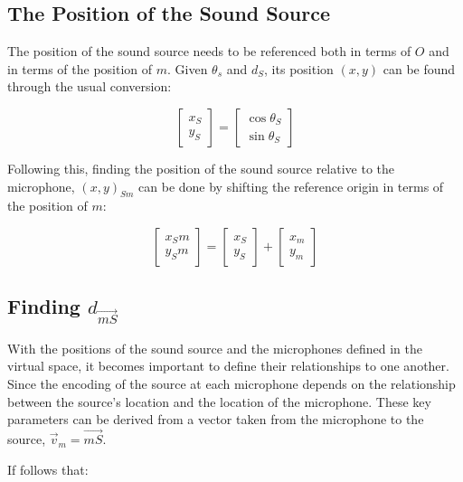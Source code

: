 \subsection{The Position of the Sound Source}

The position of the sound source needs to be referenced both in terms of $O$ and in terms of the position of $m$. Given $\theta_s$ and $d_S$, its position $(x,y)$ can be found through the usual conversion:

\begin{equation}
\begin{bmatrix} x_S \\ y_S \end{bmatrix} = \begin{bmatrix} \cos{\theta_S} \\ \sin{\theta_S} \end{bmatrix}
\end{equation}

Following this, finding the position of the sound source relative to the microphone, $(x,y)_{Sm}$ can be done by shifting the reference origin in terms of the position of $m$:

\begin{equation}
\begin{bmatrix} x_Sm \\ y_Sm \end{bmatrix} = \begin{bmatrix} x_S \\ y_S \end{bmatrix} + \begin{bmatrix} x_m \\ y_m \end{bmatrix}
\end{equation}

\subsection{Finding $d_{\vec{mS}}$}

With the positions of the sound source and the microphones defined in the virtual space, it becomes important to define their relationships to one another. Since the encoding of the source at each microphone depends on the relationship between the source's location and the location of the microphone. These key parameters can be derived from a vector taken from the microphone to the source, $\vec{v}_m = \vec{mS}$.

If follows that:

